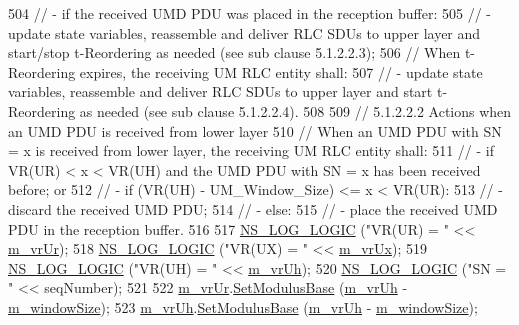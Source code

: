 \begin{DoxyCode}
504   \textcolor{comment}{// - if the received UMD PDU was placed in the reception buffer:}
505   \textcolor{comment}{// - update state variables, reassemble and deliver RLC SDUs to upper layer and start/stop t-Reordering
       as needed (see sub clause 5.1.2.2.3);}
506   \textcolor{comment}{// When t-Reordering expires, the receiving UM RLC entity shall:}
507   \textcolor{comment}{// - update state variables, reassemble and deliver RLC SDUs to upper layer and start t-Reordering as
       needed (see sub clause 5.1.2.2.4).}
508 
509   \textcolor{comment}{// 5.1.2.2.2 Actions when an UMD PDU is received from lower layer}
510   \textcolor{comment}{// When an UMD PDU with SN = x is received from lower layer, the receiving UM RLC entity shall:}
511   \textcolor{comment}{// - if VR(UR) < x < VR(UH) and the UMD PDU with SN = x has been received before; or}
512   \textcolor{comment}{// - if (VR(UH) - UM\_Window\_Size) <= x < VR(UR):}
513   \textcolor{comment}{//    - discard the received UMD PDU;}
514   \textcolor{comment}{// - else:}
515   \textcolor{comment}{//    - place the received UMD PDU in the reception buffer.}
516 
517   \hyperlink{group__logging_ga88acd260151caf2db9c0fc84997f45ce}{NS\_LOG\_LOGIC} (\textcolor{stringliteral}{"VR(UR) = "} << \hyperlink{classns3_1_1LteRlcUmLowLat_a614417e6259a873e3d2dbde0d67a1df6}{m\_vrUr});
518   \hyperlink{group__logging_ga88acd260151caf2db9c0fc84997f45ce}{NS\_LOG\_LOGIC} (\textcolor{stringliteral}{"VR(UX) = "} << \hyperlink{classns3_1_1LteRlcUmLowLat_a59217fd77422401b9cd0788a363e395c}{m\_vrUx});
519   \hyperlink{group__logging_ga88acd260151caf2db9c0fc84997f45ce}{NS\_LOG\_LOGIC} (\textcolor{stringliteral}{"VR(UH) = "} << \hyperlink{classns3_1_1LteRlcUmLowLat_aa5ff652a885ef59bdda2446f6abd3cd8}{m\_vrUh});
520   \hyperlink{group__logging_ga88acd260151caf2db9c0fc84997f45ce}{NS\_LOG\_LOGIC} (\textcolor{stringliteral}{"SN = "} << seqNumber);
521 
522   \hyperlink{classns3_1_1LteRlcUmLowLat_a614417e6259a873e3d2dbde0d67a1df6}{m\_vrUr}.\hyperlink{classns3_1_1SequenceNumber10_afd6d1e35503ecdab3a9b4b3e8c77e47c}{SetModulusBase} (\hyperlink{classns3_1_1LteRlcUmLowLat_aa5ff652a885ef59bdda2446f6abd3cd8}{m\_vrUh} - \hyperlink{classns3_1_1LteRlcUmLowLat_aecfdc0c06f03a1aa8958f06e077fd2fd}{m\_windowSize});
523   \hyperlink{classns3_1_1LteRlcUmLowLat_aa5ff652a885ef59bdda2446f6abd3cd8}{m\_vrUh}.\hyperlink{classns3_1_1SequenceNumber10_afd6d1e35503ecdab3a9b4b3e8c77e47c}{SetModulusBase} (\hyperlink{classns3_1_1LteRlcUmLowLat_aa5ff652a885ef59bdda2446f6abd3cd8}{m\_vrUh} - \hyperlink{classns3_1_1LteRlcUmLowLat_aecfdc0c06f03a1aa8958f06e077fd2fd}{m\_windowSize});

\end{DoxyCode}
